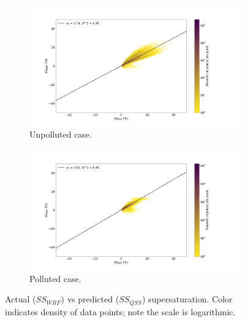 \documentclass{article}
\begin{document}
\begin{figure}[ht]
	\centering
	\begin{subfigure}{0.7\textwidth}
		\includegraphics[width=\textwidth]{revmywrf/v12_heatmap_ss_qss_vs_ss_wrf_Unpolluted_figure_4.png}
		\caption{Unpolluted case.}
		\label{wrfvsqssunpoll}
	\end{subfigure}
	\begin{subfigure}{0.7\textwidth}
		\includegraphics[width=\textwidth]{revmywrf/v12_heatmap_ss_qss_vs_ss_wrf_Polluted_figure_4.png}
		\caption{Polluted case.}
		\label{wrfvsqsspoll}
	\end{subfigure}
	\caption{Actual ($SS_{WRF}$) vs predicted ($SS_{QSS}$) supersaturation. Color indicates density of data points; note the scale is logarithmic.}
	\label{wrfvsqss}
\end{figure}
\end{document}
